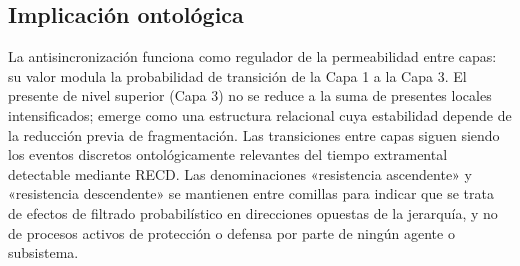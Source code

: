 \subsection{Implicación ontológica}

La antisincronización funciona como regulador de la permeabilidad entre capas: su valor modula la probabilidad de transición de la Capa 1 a la Capa 3. El presente de nivel superior (Capa 3) no se reduce a la suma de presentes locales intensificados; emerge como una estructura relacional cuya estabilidad depende de la reducción previa de fragmentación. Las transiciones entre capas siguen siendo los eventos discretos ontológicamente relevantes del tiempo extramental detectable mediante RECD. Las denominaciones «resistencia ascendente» y «resistencia descendente» se mantienen entre comillas para indicar que se trata de efectos de filtrado probabilístico en direcciones opuestas de la jerarquía, y no de procesos activos de protección o defensa por parte de ningún agente o subsistema.